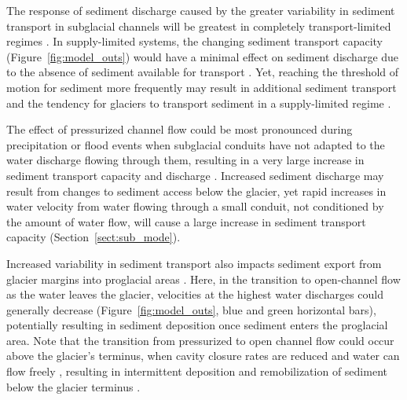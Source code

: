 \documentclass[11pt]{article}
\begin{document}
\begin{spacing}{1}
  The response of sediment discharge caused by the greater variability in sediment transport in subglacial channels will be greatest in completely transport-limited regimes \citep[e.g.][]{kasmalkar2019}.
  In supply-limited systems, the changing sediment transport capacity (Figure~\ref{fig:model_outs}) would have a minimal effect on sediment discharge due to the absence of sediment available for transport \citep{delaney2019}.
  Yet, reaching the threshold of motion for sediment more frequently may result in additional sediment transport and the tendency for glaciers to transport sediment in a supply-limited regime \citep[e.g.][]{herman2015}.
  
  The effect of pressurized channel flow could be most pronounced during precipitation or flood events when subglacial conduits have not adapted to the water discharge flowing through them, resulting in a very large increase in sediment transport capacity and discharge \citep[e.g.][]{cowan1988,delaney2019}.
  Increased sediment discharge may result from changes to sediment access below the glacier, yet rapid increases in water velocity from water flowing through a small conduit, not conditioned by the amount of water flow, will cause a large increase in sediment transport capacity (Section~\ref{sect:sub_mode}).
  
  Increased variability in sediment transport also impacts sediment export from glacier margins into proglacial areas \citep[e.g.][]{delaney2017,perolo2018}.
  Here, in the transition to open-channel flow as the water leaves the glacier, velocities at the highest water discharges could generally decrease (Figure~\ref{fig:model_outs}, blue and green horizontal bars), potentially resulting in sediment deposition once sediment enters the proglacial area.
  Note that the transition from pressurized to open channel flow could occur above the glacier's terminus, when cavity closure rates are reduced and water can flow freely \citep{egli2021b}, resulting in intermittent deposition and remobilization of sediment below the glacier terminus \citep{perolo2018}.
  

\end{spacing}
\end{document}
